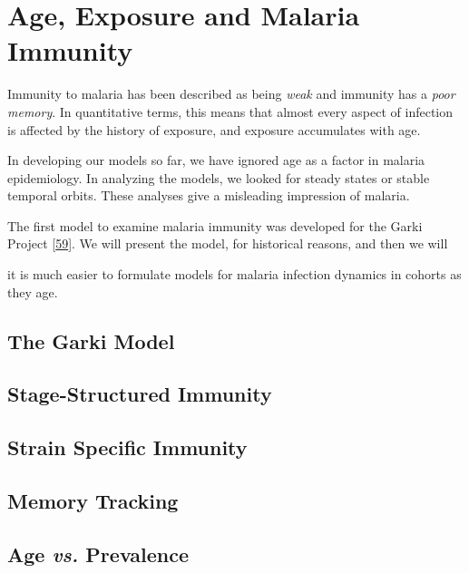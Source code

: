 \documentclass[
]{book}
\begin{document}
\hypertarget{age-exposure-and-malaria-immunity}{%
\chapter{Age, Exposure and Malaria Immunity}\label{age-exposure-and-malaria-immunity}}

Immunity to malaria has been described as being \emph{weak} and immunity has a \emph{poor memory}. In quantitative terms, this means that almost every aspect of infection is affected by the history of exposure, and exposure accumulates with age.

In developing our models so far, we have ignored age as a factor in malaria epidemiology. In analyzing the models, we looked for steady states or stable temporal orbits. These analyses give a misleading impression of malaria.

The first model to examine malaria immunity was developed for the Garki Project {[}\protect\hyperlink{ref-DietzK1974GarkiModel}{59}{]}. We will present the model, for historical reasons, and then we will

it is much easier to formulate models for malaria infection dynamics in cohorts as they age.

\hypertarget{the-garki-model}{%
\section{The Garki Model}\label{the-garki-model}}

\hypertarget{stage-structured-immunity}{%
\section{Stage-Structured Immunity}\label{stage-structured-immunity}}

\hypertarget{strain-specific-immunity}{%
\section{Strain Specific Immunity}\label{strain-specific-immunity}}

\hypertarget{memory-tracking}{%
\section{Memory Tracking}\label{memory-tracking}}

\hypertarget{age-vs.-prevalence}{%
\section{\texorpdfstring{Age \emph{vs.} Prevalence}{Age vs. Prevalence}}\label{age-vs.-prevalence}}
\end{document}

